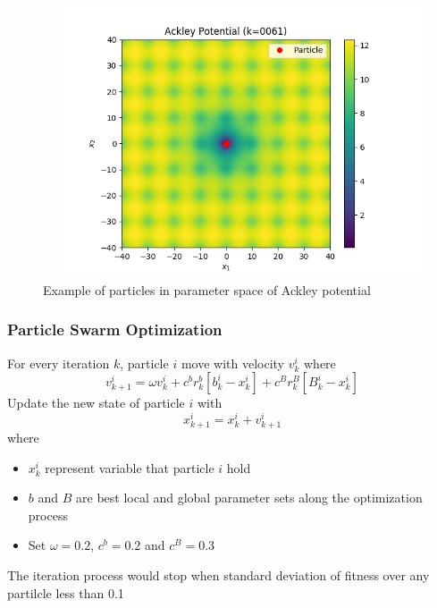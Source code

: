 \documentclass{beamer}
\begin{document}
\begin{frame}
\begin{figure}
\begin{columns}
\begin{column}{0.34\textwidth}
  \end{column}
  \begin{column}{0.34\textwidth}
    \includegraphics[width=\columnwidth]{figure/particle_swarm0061}
  \end{column}
\end{columns}
\caption{Example of particles in parameter space of Ackley potential}
\end{figure}
\end{frame}


\begin{frame}\frametitle{Particle Swarm Optimization}
For every iteration $k$, particle $i$ move with velocity $v^i_k$ where
\begin{equation*}
  v^i_{k+1} = \omega v^i_k + c^br^b_k[b^i_k-x^i_k] + c^Br^B_k[B^i_k-x^i_k]
\end{equation*}
Update the new state of particle $i$ with
\begin{equation*}
  x^i_{k+1} = x^i_k + v^i_{k+1}
\end{equation*}
where
\begin{itemize}
  \item $x^i_k$ represent variable that particle $i$ hold
  \item $b$ and $B$ are best local and global parameter sets along the optimization process
  \item Set $\omega = 0.2$, $c^b = 0.2$ and $c^B = 0.3$
\end{itemize}
The iteration process would stop when standard deviation of fitness over any partilcle less than 0.1
\end{frame}
\end{document}
